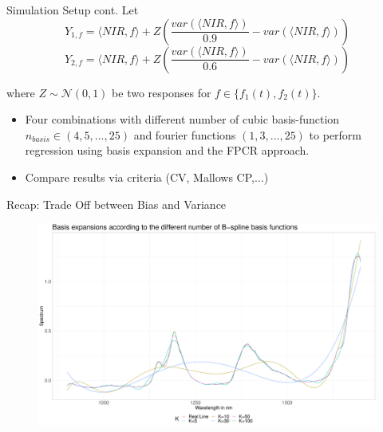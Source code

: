 \documentclass{beamer}
\begin{document}
	
	\begin{frame}{Simulation Setup cont.}
		Let 
		$$Y_{1,f} = \langle NIR, f\rangle + Z\left(  \frac{var(\langle NIR, f\rangle)}{0.9} - var(\langle NIR, f\rangle)\right)$$ 
		$$Y_{2,f} = \langle NIR, f\rangle + Z\left( \frac{var(\langle NIR, f\rangle)}{0.6} - var(\langle NIR, f\rangle)\right)$$
		
		where $Z \sim \mathcal{N}(0,1)$ be two responses for $f \in \{f_1(t), f_2(t)\}$.	
		\begin{itemize}
    		\item Four combinations with different number of cubic basis-function $n_{basis} \in (4,5,...,25)$ and fourier functions $(1,3,...,25)$ to perform regression using basis expansion and the FPCR approach.
			\item Compare results via criteria (CV, Mallows CP,...)
		
		\end{itemize}
	\end{frame}
	
	
	\begin{frame}{Recap: Trade Off between Bias and Variance}
		\begin{figure}\notag
			\includegraphics[width = \textwidth]{../Graphics/basis_expansions.pdf}
		\end{figure}
	\end{frame}
	
\end{document}

